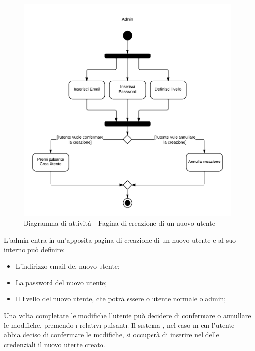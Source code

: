 \begin{figure}[H]
\centering
\includegraphics[scale=0.2]{uml/attivita/MaaP - Crea nuovo utente.png}
\caption{Diagramma di attività - Pagina di creazione di un nuovo utente}
\end{figure}

L'admin entra in un'apposita pagina di creazione di un nuovo utente e al suo interno può definire:

\begin{itemize}

	\item L'indirizzo email del nuovo utente;
	\item La password del nuovo utente;
	\item Il livello del nuovo utente, che potrà essere o utente normale o admin;

\end{itemize}

Una volta completate le modifiche l'utente può decidere di confermare o annullare le modifiche, premendo i relativi pulsanti. Il sistema , nel caso in cui l'utente abbia deciso di confermare le modifiche, si occuperà di inserire nel  delle credenziali il nuovo utente creato.

